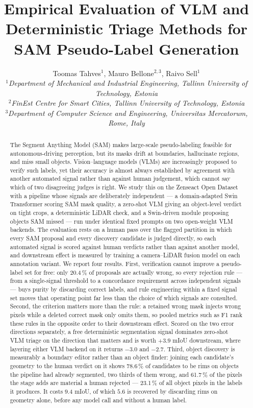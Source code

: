 \documentclass[conference]{IEEEtran}
\title{Empirical Evaluation of VLM and Deterministic Triage Methods for SAM Pseudo-Label Generation}
\author{\small Toomas Tahves$^{1}$, Mauro Bellone$^{2,3}$, Raivo Sell$^{1}$ \\
$^{1}$\textit{Department of Mechanical and Industrial Engineering, Tallinn University of Technology, Estonia} \\
$^{2}$\textit{FinEst Centre for Smart Cities, Tallinn University of Technology, Estonia} \\
$^{3}$\textit{Department of Computer Science and Engineering, Universitas Mercatorum, Rome, Italy} \\
}
\begin{document}
\maketitle

\begin{abstract}
The Segment Anything Model (SAM) makes large-scale pseudo-labeling feasible for autonomous-driving perception, but its masks drift at boundaries, hallucinate regions, and miss small objects.
Vision--language models (VLMs) are increasingly proposed to verify such labels, yet their accuracy is almost always established by agreement with another automated signal rather than against human judgement, which cannot say which of two disagreeing judges is right.
We study this on the Zenseact Open Dataset with a pipeline whose signals are deliberately independent --- a domain-adapted Swin Transformer scoring SAM mask quality, a zero-shot VLM giving an object-level verdict on tight crops, a deterministic LiDAR check, and a Swin-driven module proposing objects SAM missed --- run under identical fixed prompts on two open-weight VLM backends.
The evaluation rests on a human pass over the flagged partition in which every SAM proposal and every discovery candidate is judged directly, so each automated signal is scored against human verdicts rather than against another model, and downstream effect is measured by training a camera--LiDAR fusion model on each annotation variant.
We report four results.
First, verification cannot improve a pseudo-label set for free: only 20.4\,\% of proposals are actually wrong, so every rejection rule --- from a single-signal threshold to a concordance requirement across independent signals --- buys purity by discarding correct labels, and rule engineering within a fixed signal set moves that operating point far less than the choice of which signals are consulted.
Second, the criterion matters more than the rule: a retained wrong mask injects wrong pixels while a deleted correct mask only omits them, so pooled metrics such as F1 rank these rules in the opposite order to their downstream effect. Scored on the two error directions separately, a free deterministic segmentation signal dominates zero-shot VLM triage on the direction that matters and is worth $+3.9$ mIoU downstream, where layering either VLM backend on it returns $-3.0$ and $-2.7$.
Third, object discovery is measurably a boundary editor rather than an object finder: joining each candidate's geometry to the human verdict on it shows 78.6\,\% of candidates to be rims on objects the pipeline had already segmented, two thirds of them wrong, and 61.7\,\% of the pixels the stage adds are material a human rejected --- 23.1\,\% of all object pixels in the labels it produces. It costs $9.4$ mIoU, of which $5.6$ is recovered by discarding rims on geometry alone, before any model call and without a human label.

\end{abstract}
\end{document}
